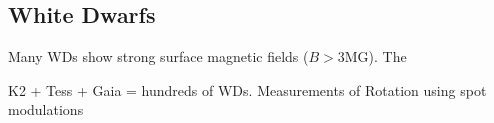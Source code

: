 {\color{red} \subsection{White Dwarfs}}
Many WDs show strong surface magnetic fields ($B>$3MG). The 

K2 + Tess + Gaia = hundreds of WDs. Measurements of Rotation using spot modulations